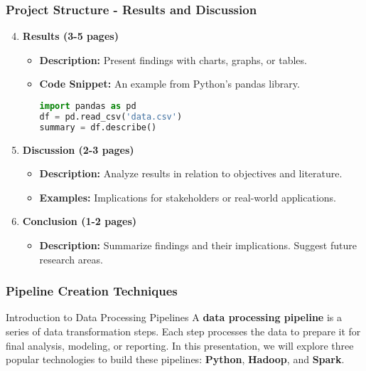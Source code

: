 \documentclass[aspectratio=169]{beamer}
\begin{document}
\begin{frame}[fragile]
    \frametitle{Project Structure - Results and Discussion}

    \begin{enumerate}
        \setcounter{enumi}{3} %
        \item \textbf{Results (3-5 pages)}
            \begin{itemize}
                \item \textbf{Description:} Present findings with charts, graphs, or tables.
                \item \textbf{Code Snippet:} An example from Python's pandas library.
                \begin{lstlisting}[language=Python]
import pandas as pd
df = pd.read_csv('data.csv')
summary = df.describe()
                \end{lstlisting}
            \end{itemize}

        \item \textbf{Discussion (2-3 pages)}
            \begin{itemize}
                \item \textbf{Description:} Analyze results in relation to objectives and literature.
                \item \textbf{Examples:} Implications for stakeholders or real-world applications.
            \end{itemize}

        \item \textbf{Conclusion (1-2 pages)}
            \begin{itemize}
                \item \textbf{Description:} Summarize findings and their implications. Suggest future research areas.
            \end{itemize}
    \end{enumerate}
\end{frame}

\begin{frame}
    \frametitle{Pipeline Creation Techniques}
    \begin{block}{Introduction to Data Processing Pipelines}
        A \textbf{data processing pipeline} is a series of data transformation steps. Each step processes the data to prepare it for final analysis, modeling, or reporting. In this presentation, we will explore three popular technologies to build these pipelines: \textbf{Python}, \textbf{Hadoop}, and \textbf{Spark}.
    \end{block}
\end{frame}
\end{document}
